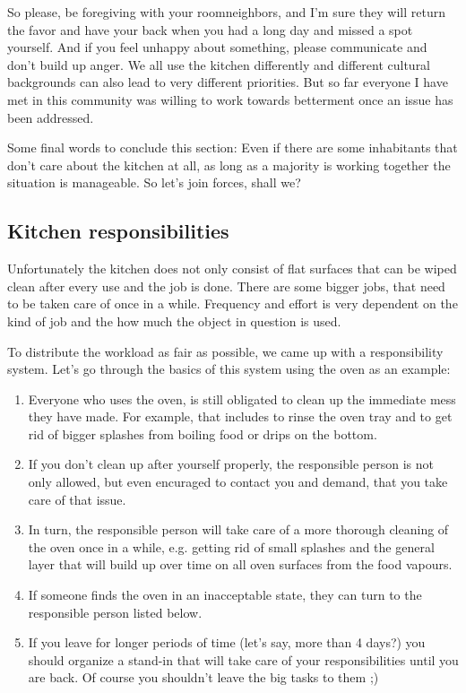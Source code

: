 So please, be foregiving with your roomneighbors, and I'm sure they will return the favor and have your back when you had a long day and missed a spot yourself. And if you feel unhappy about something, please communicate and don't build up anger. We all use the kitchen differently and different cultural backgrounds can also lead to very different priorities. But so far everyone I have met in this community was willing to work towards betterment once an issue has been addressed.

Some final words to conclude this section: Even if there are some inhabitants that don't care about the kitchen at all, as long as a majority is working together the situation is manageable. So let's join forces, shall we?

\subsection{Kitchen responsibilities}

Unfortunately the kitchen does not only consist of flat surfaces that can be wiped clean after every use and the job is done. There are some bigger jobs, that need to be taken care of once in a while. Frequency and effort is very dependent on the kind of job and the how much the object in question is used.

To distribute the workload as fair as possible, we came up with a responsibility system. Let's go through the basics of this system using the oven as an example:
\begin{enumerate}
    \item Everyone who uses the oven, is still obligated to clean up the immediate mess they have made. For example, that includes to rinse the oven tray and to get rid of bigger splashes from boiling food or drips on the bottom.
    \item If you don't clean up after yourself properly, the responsible person is not only allowed, but even encuraged to contact you and demand, that you take care of that issue.
    \item In turn, the responsible person will take care of a more thorough cleaning of the oven once in a while, e.g. getting rid of small splashes and the general layer that will build up over time on all oven surfaces from the food vapours.
    \item If someone finds the oven in an inacceptable state, they can turn to the responsible person listed below.
    \item If you leave for longer periods of time (let's say, more than 4 days?) you should organize a stand-in that will take care of your responsibilities until you are back. Of course you shouldn't leave the big tasks to them ;)
\end{enumerate}

